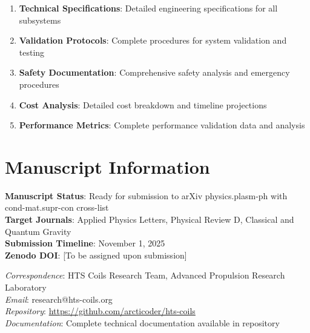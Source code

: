 \documentclass[12pt,a4paper]{article}
\begin{document}
\begin{enumerate}
\item \textbf{Technical Specifications}: Detailed engineering specifications for all subsystems
\item \textbf{Validation Protocols}: Complete procedures for system validation and testing
\item \textbf{Safety Documentation}: Comprehensive safety analysis and emergency procedures
\item \textbf{Cost Analysis}: Detailed cost breakdown and timeline projections
\item \textbf{Performance Metrics}: Complete performance validation data and analysis
\end{enumerate}

\section*{Manuscript Information}

\textbf{Manuscript Status}: Ready for submission to arXiv physics.plasm-ph with cond-mat.supr-con cross-list\\
\textbf{Target Journals}: Applied Physics Letters, Physical Review D, Classical and Quantum Gravity\\
\textbf{Submission Timeline}: November 1, 2025\\
\textbf{Zenodo DOI}: [To be assigned upon submission]

\textit{Correspondence}: HTS Coils Research Team, Advanced Propulsion Research Laboratory\\
\textit{Email}: research@hts-coils.org\\
\textit{Repository}: \url{https://github.com/arcticoder/hts-coils}\\
\textit{Documentation}: Complete technical documentation available in repository
\end{document}
